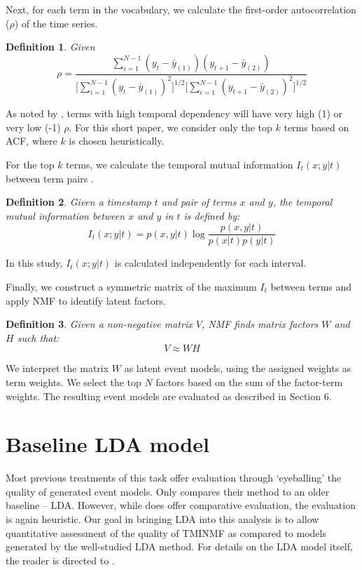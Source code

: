 \documentclass{sig-alternate}
\newtheorem{definition}{Definition}
\begin{document}
Next, for each term in the vocabulary, we calculate the first-order autocorrelation ($\rho$) of the time series. 
\begin{definition}
 Given 
\[
\rho = \dfrac{\sum_{i=1}^{N-1} (y_t - \bar{y}_{(1)})(y_{t+1} - \bar{y}_{(2)})}{ \big [ \sum_{i=1}^{N-1}  (y_t - \bar{y}_{(1)})^2 \big ] ^{1/2} \big [\sum_{i=1}^{N-1} (y_{t+1} - \bar{y}_{(2)})^2 \big ]^{1/2}}
\]
\end{definition}

As noted by \cite{Jones2007}, terms with high temporal dependency will have very high (1) or very low (-1) $\rho$.  For this short paper, we consider only the top $k$ terms based on ACF, where $k$ is chosen heuristically.

For the top $k$ terms, we calculate the temporal mutual information $I_t(x;y \vert t)$ between term pairs \cite{Teng2008}. 

\begin{definition}
Given a timestamp $t$ and pair of terms $x$ and $y$, the temporal mutual information between $x$ and $y$ in $t$ is defined by:
\[
I_t(x;y \vert t) = p(x,y \vert t) \log \dfrac{p(x,y \vert t)}{p(x \vert t) p(y \vert t)}
\]
\end{definition}

In this study, $I_t(x;y \vert t)$ is calculated independently for each interval.

Finally, we construct a symmetric matrix of the maximum $I_t$ between terms and apply NMF \cite{Lee2001} to identify latent factors. 
\begin{definition}
 Given a non-negative matrix $V$, NMF finds matrix factors $W$ and $H$ such that:
\[
V \approx WH
\]
\end{definition}

We interpret the matrix $W$ as latent event models, using the assigned weights as term weights. We select the top $N$ factors based on the sum of the factor-term weights. The resulting event models are evaluated as described in Section 6.

\section{Baseline LDA model}

Most previous treatments of this task offer evaluation through `eyeballing' the quality of generated event models. Only \cite{Weng2011} compares their  method to an older baseline -- LDA.  However, while \cite{Weng2011} does offer comparative evaluation, the evaluation is again heuristic. Our goal in bringing LDA into this analysis is to allow quantitative assessment of the quality of TMINMF as compared to models generated by the well-studied LDA method. For details on the LDA model itself, the reader is directed to \cite{Blei2003}.
\end{document}
